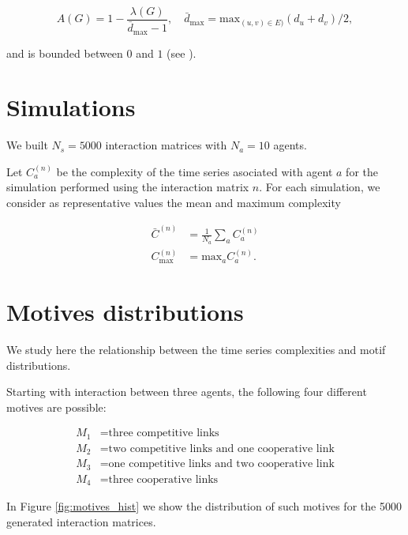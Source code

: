 \documentclass[10pt]{article}
\begin{document}
\begin{equation}
A(G) = 1 - \dfrac{\lambda(G)}{\bar{d}_{\mathrm{max}} - 1},\quad \bar{d}_{\mathrm{max}} = \mathrm{max}_{(u,v)\in E)} (d_u + d_v) / 2,
\end{equation}

and is bounded between $0$ and $1$ (see \cite{Belardo}).

\section{Simulations}

We built $N_s = 5000$ interaction matrices with $N_a = 10$ agents.
 
Let $C_a^{(n)}$ be the complexity of the time series asociated with agent $a$ for the simulation performed using the interaction matrix $n$. For each simulation, we consider as representative values the mean and maximum complexity

\begin{align}
  \bar{C}^{(n)} &= \frac{1}{N_a} \sum_a C_a^{(n)} \\
  C_{\mathrm{max}}^{(n)} &= \mathrm{max}_a C_a^{(n)}.
\end{align}

\section{Motives distributions}

We study here the relationship between the time series complexities and motif distributions. 

Starting with interaction between three agents, the following four different motives are possible:

\begin{align*}
M_1 &= \text{three competitive links} \\
M_2 &= \text{two competitive links and one cooperative link} \\
M_3 &= \text{one competitive links and two cooperative link} \\ 
M_4 &= \text{three cooperative links} 
\end{align*}

In Figure \ref{fig:motives_hist} we show the distribution of such motives for the 5000 generated interaction matrices.
\end{document}
